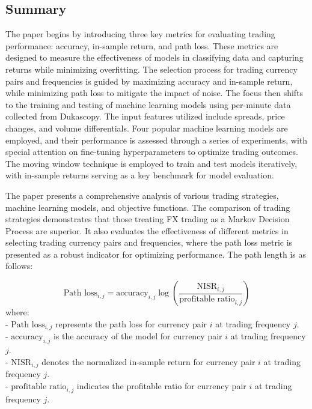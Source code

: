 \documentclass{article}
\begin{document}
    \subsection*{Summary}
    The paper begins by introducing three key metrics for evaluating trading performance: accuracy, in-sample return, and path loss. These metrics are designed to measure the effectiveness of models in classifying data and capturing returns while minimizing overfitting. The selection process for trading currency pairs and frequencies is guided by maximizing accuracy and in-sample return, while minimizing path loss to mitigate the impact of noise. The focus then shifts to the training and testing of machine learning models using per-minute data collected from Dukascopy. The input features utilized include spreads, price changes, and volume differentials. Four popular machine learning models are employed, and their performance is assessed through a series of experiments, with special attention on fine-tuning hyperparameters to optimize trading outcomes. The moving window technique is employed to train and test models iteratively, with in-sample returns serving as a key benchmark for model evaluation.
    
    The paper presents a comprehensive analysis of various trading strategies, machine learning models, and objective functions. The comparison of trading strategies demonstrates that those treating FX trading as a Markov Decision Process are superior. It also evaluates the effectiveness of different metrics in selecting trading currency pairs and frequencies, where the path loss metric is presented as a robust indicator for optimizing performance. The path length is as follows:

    \begin{equation}
    \text{Path loss}_{i,j} = \text{accuracy}_{i,j} \log\left(\frac{\text{NISR}_{i,j}}{\text{profitable ratio}_{i,j}}\right)
    \end{equation}
    where:\\
    - $\text{Path loss}_{i,j}$ represents the path loss for currency pair $i$ at trading frequency $j$.\\
    - $\text{accuracy}_{i,j}$ is the accuracy of the model for currency pair $i$ at trading frequency $j$.\\
    - $\text{NISR}_{i,j}$ denotes the normalized in-sample return for currency pair $i$ at trading frequency $j$.\\
    - $\text{profitable ratio}_{i,j}$ indicates the profitable ratio for currency pair $i$ at trading frequency $j$.\\\\
\end{document}
